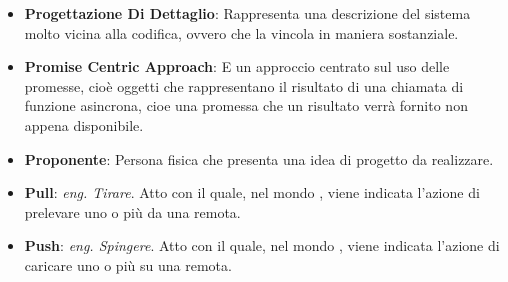 \begin{itemize}
	\item
	\textbf{Progettazione Di Dettaglio}: Rappresenta una descrizione del sistema molto vicina alla codifica, ovvero che la vincola in maniera sostanziale.
	\item
	\textbf{Promise Centric Approach}: E un approccio centrato sul uso delle promesse, cioè oggetti che rappresentano il risultato di una chiamata di funzione asincrona, cioe una promessa che un risultato verrà fornito non appena disponibile.
	\item
	\textbf{Proponente}: Persona fisica che presenta una idea di progetto da realizzare.
	\item
	\textbf{Pull}: \textit{eng. Tirare}. Atto con il quale, nel mondo , viene indicata l'azione di prelevare uno o più  da una  remota.
	\item
	\textbf{Push}: \textit{eng. Spingere}. Atto con il quale, nel mondo , viene indicata l'azione di caricare uno o più  su una  remota.
\end{itemize}
\newpage